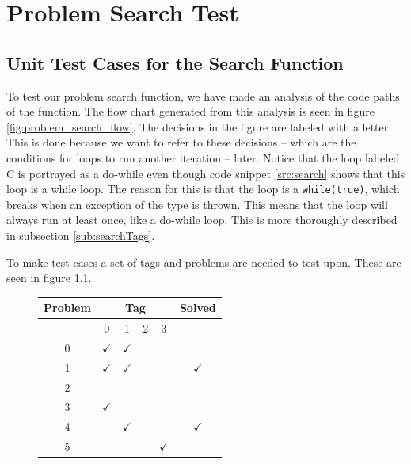 \chapter{Problem Search Test}
\label{chap:problem_search_test}

\section{Unit Test Cases for the Search Function}
To test our problem search function, we have made an analysis of the code paths of the function.
The flow chart generated from this analysis is seen in figure \ref{fig:problem_search_flow}.
The decisions in the figure are labeled with a letter.
This is done because we want to refer to these decisions -- which are the conditions for loops to run another iteration -- later.
Notice that the loop labeled C is portrayed as a do-while even though code snippet \ref{src:search} shows that this loop is a while loop.
The reason for this is that the loop is a \verb|while(true)|, which breaks when an exception of the type  is thrown.
This means that the loop will always run at least once, like a do-while loop.
This is more thoroughly described in subsection \ref{sub:searchTags}.

To make test cases a set of tags and problems are needed to test upon.
These are seen in figure \ref{tab:problem_search_base}.

\begin{figure}[hp]
	\centering
		\begin{tabular}{|c|c|c|c|c|c|}
		\hline
			Problem	& \multicolumn{4}{c|}{Tag} & Solved \\ \hline
								& 0&1&2&3& \\ \hline
			0					& $\checkmark$ & $\checkmark$ & & & \\ \hline
			1					& $\checkmark$ & $\checkmark$ & & & $\checkmark$  \\ \hline
			2					& & & & & \\ \hline
			3					& $\checkmark$& & & & \\ \hline
			4					& & $\checkmark$& & & $\checkmark$ \\ \hline
			5					& & & & $\checkmark$ & \\ \hline
		\end{tabular}
	\label{tab:problem_search_base}
\end{figure}

